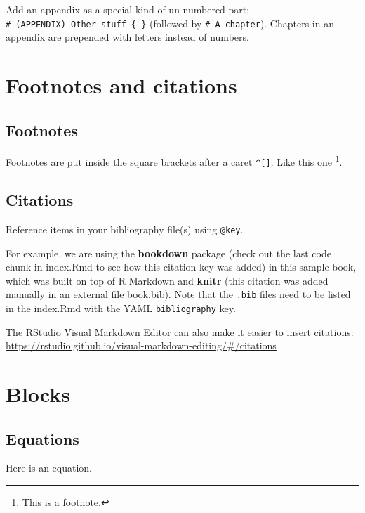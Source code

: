 \documentclass[
]{book}
\theoremstyle{definition}
\theoremstyle{definition}
\theoremstyle{definition}
\theoremstyle{definition}
\theoremstyle{remark}
\begin{document}
Add an appendix as a special kind of un-numbered part: \texttt{\#\ (APPENDIX)\ Other\ stuff\ \{-\}} (followed by \texttt{\#\ A\ chapter}). Chapters in an appendix are prepended with letters instead of numbers.

\hypertarget{footnotes-and-citations}{%
\section{Footnotes and citations}\label{footnotes-and-citations}}

\hypertarget{footnotes}{%
\subsection{Footnotes}\label{footnotes}}

Footnotes are put inside the square brackets after a caret \texttt{\^{}{[}{]}}. Like this one \footnote{This is a footnote.}.

\hypertarget{citations}{%
\subsection{Citations}\label{citations}}

Reference items in your bibliography file(s) using \texttt{@key}.

For example, we are using the \textbf{bookdown} package \citep{R-bookdown} (check out the last code chunk in index.Rmd to see how this citation key was added) in this sample book, which was built on top of R Markdown and \textbf{knitr} \citep{xie2015} (this citation was added manually in an external file book.bib).
Note that the \texttt{.bib} files need to be listed in the index.Rmd with the YAML \texttt{bibliography} key.

The RStudio Visual Markdown Editor can also make it easier to insert citations: \url{https://rstudio.github.io/visual-markdown-editing/\#/citations}

\hypertarget{blocks}{%
\section{Blocks}\label{blocks}}

\hypertarget{equations}{%
\subsection{Equations}\label{equations}}

Here is an equation.
\end{document}
